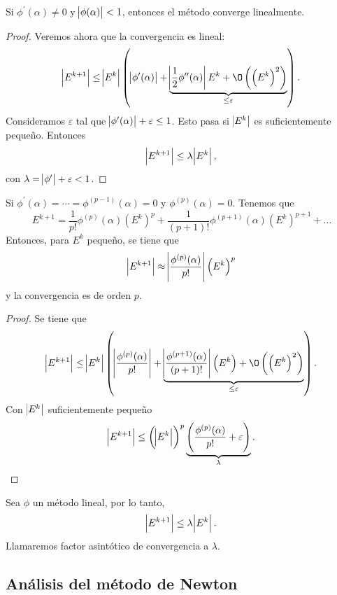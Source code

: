 \begin{prop}
    Si $\phi^\prime(\alpha) \neq 0$ y $\abs{\phi(\alpha)} < 1$, entonces el método converge linealmente.
\end{prop}

\begin{proof}
    Veremos ahora que la convergencia es lineal:
    \[
        \abs{E^{k+1}} \leq \abs{E^k} \left( \abs{\phi^\prime(\alpha)} + 
            \underbrace{\abs{\frac{1}{2} \phi^{\prime \prime}(\alpha)} E^k +
            \O\left( \left( E^k \right)^2 \right)}_{\leq \varepsilon} \right).
    \]
    Consideramos $\varepsilon$ tal que $\abs{\phi^\prime(\alpha)} + \varepsilon \leq 1$. Esto pasa
    si $\abs{E^k}$ es suficientemente pequeño. Entonces
    \[
        \abs{E^{k+1}} \leq \lambda \abs{E^k},
    \]
    con $\lambda = \abs{\phi^\prime} + \varepsilon < 1$.
\end{proof}

\begin{prop}
    Si $\phi^\prime(\alpha) = \cdots = \phi^{(p-1)}(\alpha) = 0$ y $\phi^{(p)}(\alpha) = 0$. Tenemos que
    \[
        E^{k+1} = \frac{1}{p!}\phi^{(p)}(\alpha) \left( E^k \right)^p +
        \frac{1}{(p+1)!} \phi^{(p+1)}(\alpha) \left( E^k \right)^{p+1} + \dots
    \]
    Entonces, para $E^k$ pequeño, se tiene que
    \[
        \abs{E^{k+1}} \approx \abs{\frac{\phi^{(p)}(\alpha)}{p!}} \left( E^k \right)^p
    \]
    y la convergencia es de orden $p$.
\end{prop}

\begin{proof}
    Se tiene que
    \[
        \abs{E^{k+1}} \leq \abs{E^k} \left( \abs{\frac{\phi^{(p)}(\alpha)}{p!}} +
        \underbrace{\abs{\frac{\phi^{(p+1)}(\alpha)}{(p+1)!}} \left( E^k \right) +
        \O\left( \left( E^k \right)^2 \right)}_{\leq \varepsilon} \right).
    \]
    Con $\abs{E^k}$ suficientemente pequeño
    \[
        \abs{E^{k+1}} \leq \left( \abs{E^k} \right)^p
        \underbrace{\left( \frac{\phi^{(p)}(\alpha)}{p!} + \varepsilon  \right)}_{\lambda}.
    \]
\end{proof}

\begin{defi}
    Sea $\phi$ un método lineal, por lo tanto,
    \[
        \abs{E^{k+1}} \leq \lambda \abs{E^k}.
    \]
    Llamaremos factor asintótico de convergencia a $\lambda$.
\end{defi}

\subsection{Análisis del método de Newton}

